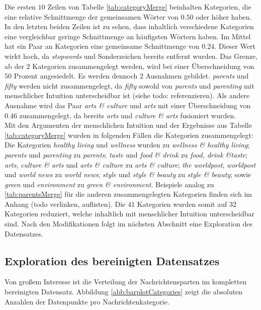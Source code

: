 \documentclass[a4paper,11pt]{article}
\begin{document}
Die ersten $10$ Zeilen von Tabelle \ref{tab:categoryMerge} beinhalten Kategorien, die eine relative Schnittmenge der gemeinsamen Wörter von $0.50$ oder höher haben. In den letzten beiden Zeilen ist zu sehen, dass inhaltlich verschiedene Kategorien eine vergleichbar geringe Schnittmenge an häufigsten Wörtern haben. Im Mittel hat ein Paar an Kategorien eine gemeinsame Schnittmenge von $0.24$. Dieser Wert wirkt hoch, da \textit{stopwords} und Sonderzeichen bereits entfernt wurden.
Das Grenze, ab der $2$ Kategorien zusammengelegt werden, wird bei einer Überschneidung von $50$ Prozent angesiedelt. Es werden dennoch $2$ Ausnahmen gebildet. \textit{parents} und \textit{fifty} werden nicht zusammengelegt, da \textit{fifty} sowohl von \textit{parents} und \textit{parenting} mit menschlicher Intuition unterscheidbar ist (siehe todo: referenzieren). Als andere Ausnahme wird das Paar \textit{arts \& culture} und \textit{arts} mit einer Überschneidung von $0.46$ zusammengelegt, da bereits \textit{arts} und \textit{culture \& arts} fusioniert wurden.\\
Mit den Argumenten der menschlichen Intuition und der Ergebnisse aus Tabelle \ref{tab:categoryMerge} wurden in folgenden Fällen die Kategorien zusammengelegt:
Die Kategorien \textit{healthy living} und \textit{wellness} wurden zu \textit{wellness \& healthy living}; \textit{parents} und \textit{parenting}  zu \textit{parents}; \textit{taste} und \textit{food \& drink} zu \textit{food, drink \&taste}; \textit{arts}, \textit{culture \& arts} und \textit{arts \& culture} zu \textit{arts \& culture}; \textit{the worldpost}, \textit{worldpost} und \textit{world news} zu \textit{world news}; \textit{style} und \textit{style \& beauty} zu \textit{style \& beauty};  sowie \textit{green} und \textit{environment} zu \textit{green \& environment}. Beispiele analog zu \ref{tab:parentsMerge} für die anderen zusammengelegten Kategorien finden sich im Anhang (todo verlinken, auflisten). Die $41$ Kategorien wurden somit auf $32$ Kategorien reduziert, welche inhaltlich mit menschlicher Intuition unterscheidbar sind. Nach den Modifikationen folgt im nächsten Abschnitt eine Exploration des Datensatzes.

\subsection{Exploration des bereinigten Datensatzes}

Von großem Interesse ist die Verteilung der Nachrichtensparten im kompletten bereinigten Datensatz.
Abbildung \ref{abb:barplotCategories} zeigt die absoluten Anzahlen der Datenpunkte pro Nachrichtenkategorie. 
\end{document}
